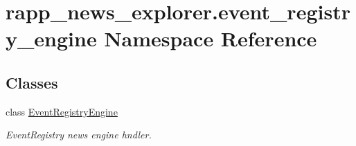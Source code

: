 \hypertarget{namespacerapp__news__explorer_1_1event__registry__engine}{\section{rapp\-\_\-news\-\_\-explorer.\-event\-\_\-registry\-\_\-engine Namespace Reference}
\label{namespacerapp__news__explorer_1_1event__registry__engine}
}
\subsection*{Classes}
\begin{DoxyCompactItemize}
\item 
class \hyperlink{classrapp__news__explorer_1_1event__registry__engine_1_1EventRegistryEngine}{Event\-Registry\-Engine}
\begin{DoxyCompactList}\small\item\em Event\-Registry news engine hndler. \end{DoxyCompactList}\end{DoxyCompactItemize}
